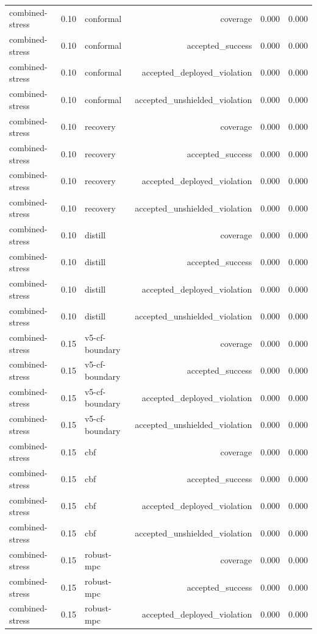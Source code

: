\documentclass{article}
\begin{document}
\begin{longtable}{@{}lllrrr@{}}
combined-stress & 0.10 & conformal & coverage & 0.000 & 0.000 \\
combined-stress & 0.10 & conformal & accepted\_success & 0.000 & 0.000 \\
combined-stress & 0.10 & conformal & accepted\_deployed\_violation & 0.000 & 0.000 \\
combined-stress & 0.10 & conformal & accepted\_unshielded\_violation & 0.000 & 0.000 \\
combined-stress & 0.10 & recovery & coverage & 0.000 & 0.000 \\
combined-stress & 0.10 & recovery & accepted\_success & 0.000 & 0.000 \\
combined-stress & 0.10 & recovery & accepted\_deployed\_violation & 0.000 & 0.000 \\
combined-stress & 0.10 & recovery & accepted\_unshielded\_violation & 0.000 & 0.000 \\
combined-stress & 0.10 & distill & coverage & 0.000 & 0.000 \\
combined-stress & 0.10 & distill & accepted\_success & 0.000 & 0.000 \\
combined-stress & 0.10 & distill & accepted\_deployed\_violation & 0.000 & 0.000 \\
combined-stress & 0.10 & distill & accepted\_unshielded\_violation & 0.000 & 0.000 \\
combined-stress & 0.15 & v5-cf-boundary & coverage & 0.000 & 0.000 \\
combined-stress & 0.15 & v5-cf-boundary & accepted\_success & 0.000 & 0.000 \\
combined-stress & 0.15 & v5-cf-boundary & accepted\_deployed\_violation & 0.000 & 0.000 \\
combined-stress & 0.15 & v5-cf-boundary & accepted\_unshielded\_violation & 0.000 & 0.000 \\
combined-stress & 0.15 & cbf & coverage & 0.000 & 0.000 \\
combined-stress & 0.15 & cbf & accepted\_success & 0.000 & 0.000 \\
combined-stress & 0.15 & cbf & accepted\_deployed\_violation & 0.000 & 0.000 \\
combined-stress & 0.15 & cbf & accepted\_unshielded\_violation & 0.000 & 0.000 \\
combined-stress & 0.15 & robust-mpc & coverage & 0.000 & 0.000 \\
combined-stress & 0.15 & robust-mpc & accepted\_success & 0.000 & 0.000 \\
combined-stress & 0.15 & robust-mpc & accepted\_deployed\_violation & 0.000 & 0.000 \\

\end{longtable}
\end{document}
